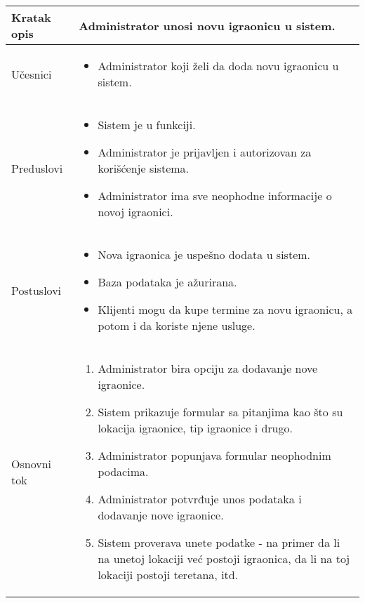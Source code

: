 \documentclass[../main.tex]{subfiles}
\begin{document}
\begin{longtable}{| p{} | p{} |} 

\hline
    Kratak opis & Administrator unosi novu igraonicu u sistem. \\ 
\hline    
    Učesnici & 
    	\begin{itemize}
        \item Administrator koji želi da doda novu igraonicu u sistem.
     \end{itemize}\\
\hline
   Preduslovi & \begin{itemize}
       \item Sistem je u funkciji.
       \item Administrator je prijavljen i autorizovan za korišćenje sistema.
       \item Administrator ima sve neophodne informacije o novoj igraonici.
   \end{itemize}\\
\hline  
    Postuslovi & \begin{itemize}
        \item Nova igraonica je uspešno dodata u sistem.
        \item Baza podataka je ažurirana.
        \item Klijenti mogu da kupe termine za novu igraonicu, a potom i da koriste njene usluge.
    \end{itemize}\\
\hline
    Osnovni tok & \begin{enumerate}
        \item Administrator bira opciju za dodavanje nove igraonice.
        \item Sistem prikazuje formular sa pitanjima kao što su lokacija igraonice, tip igraonice i drugo.
        \item Administrator popunjava formular neophodnim podacima.
        \item Administrator potvrđuje unos podataka i dodavanje nove igraonice. %
        \item Sistem proverava unete podatke - na primer da li na unetoj lokaciji već postoji igraonica, da li na toj lokaciji postoji teretana, itd. %

\end{enumerate}
\end{longtable}
\end{document}
